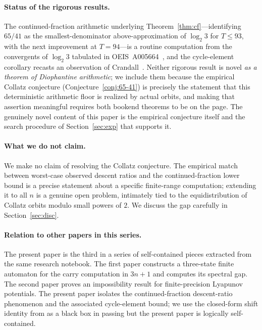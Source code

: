\documentclass[11pt,a4paper]{article}
\theoremstyle{definition}
\theoremstyle{remark}
\begin{document}
\paragraph{Status of the rigorous results.}
The continued-fraction arithmetic underlying
Theorem~\ref{thm:cf}---identifying $65/41$ as the smallest-denominator
above-approximation of $\log_2 3$ for $T \leq 93$, with the next
improvement at $T = 94$---is a routine computation from the
convergents of $\log_2 3$ tabulated in OEIS~A005664~\cite{OEIS-A005664},
and the cycle-element corollary recasts an observation of
Crandall~\cite{Crandall1978}.  Neither rigorous result is novel
\emph{as a theorem of Diophantine arithmetic}; we include them because
the empirical Collatz conjecture
(Conjecture~\ref{conj:65-41}) is precisely the statement that this
deterministic arithmetic floor is realized by actual orbits, and
making that assertion meaningful requires both bookend theorems to be
on the page.  The genuinely novel content of this paper is the
empirical conjecture itself and the search procedure of
Section~\ref{sec:exp} that supports it.

\paragraph{What we do not claim.}
We make no claim of resolving the Collatz conjecture.  The empirical
match between worst-case observed descent ratios and the
continued-fraction lower bound is a precise statement about a
specific finite-range computation; extending it to all $n$ is a
genuine open problem, intimately tied to the equidistribution of
Collatz orbits modulo small powers of $2$.  We discuss the gap
carefully in Section~\ref{sec:disc}.

\paragraph{Relation to other papers in this series.}
The present paper is the third in a series of self-contained pieces
extracted from the same research notebook.  The first paper
\cite{ChangPaperA} constructs a three-state finite automaton for the
carry computation in $3n + 1$ and computes its spectral gap.  The
second paper \cite{ChangPaperB} proves an impossibility result for
finite-precision Lyapunov potentials.  The present paper isolates the
continued-fraction descent-ratio phenomenon and the associated
cycle-element bound; we use the closed-form shift identity from
\cite{ChangPaperA} as a black box in passing but the present paper
is logically self-contained.
\end{document}
